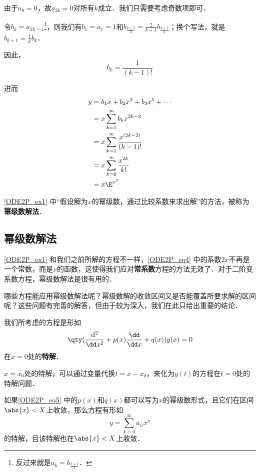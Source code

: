 \begin{example}{}
由于$a_0=0$，故$a_{2k}=0$对所有$k$成立．我们只需要考虑奇数项即可．

令$b_k=a_{2k-1}$\footnote{反过来就是$a_k=b_{\frac{k+1}{2}}$．}，则我们有$b_1=a_1=1$和$b_{\frac{k+3}{2}}=\frac{2}{k+1}b_{\frac{k+1}{2}}$；换个写法，就是$b_{k+1}=\frac{1}{k}b_k$．

因此，
\begin{equation}
b_k=\frac{1}{(k-1)!}
\end{equation}

进而
\begin{equation}\label{ODE2P_eq6}
\begin{aligned}
y&=b_1x+b_2x^3+b_3x^5+\cdots\\
 &=x\sum\limits_{k=1}^\infty b_kx^{2k-2}\\
 &=x\sum\limits_{k=1}^\infty \frac{x^{(2k-2)}}{(k-1)!}\\
 &=x\sum\limits_{k=0}^\infty \frac{x^{2k}}{k!}\\
 &=x\E^{x^2} 
\end{aligned}
\end{equation}

\end{example}

\autoref{ODE2P_ex1} 中“假设解为$x$的幂级数，通过比较系数来求出解”的方法，被称为\textbf{幂级数解法}．


\subsection{幂级数解法}

\autoref{ODE2P_ex1} 和我们之前所解的方程不一样，\autoref{ODE2P_eq4} 中的系数$2x$不再是一个常数，而是$x$的函数，这使得我们应对\textbf{常系数}方程的方法无效了．对于二阶变系数方程，幂级数解法是很有用的．

哪些方程能应用幂级数解法呢？幂级数解的收敛区间又是否能覆盖所要求解的区间呢？这些问题有完善的解答，但由于较为深入，我们在此只给出重要的结论．

我们所考虑的方程是形如
\begin{equation}\label{ODE2P_eq5}
\qty(\frac{\mathrm{d}^2}{\dd x^2}+p(x)\frac{\dd}{\dd x}+q(x))y(x)=0
\end{equation}
在$x=0$处的\textbf{特解}．

$x=x_0$处的特解，可以通过变量代换$t=x-x_0$，来化为$y(t)$的方程在$t=0$处的特解问题．

\begin{theorem}{}\label{ODE2P_the2}
如果\autoref{ODE2P_eq5} 中的$p(x)$和$q(x)$都可以写为$x$的幂级数形式，且它们在区间$\abs{x}<X$上收敛，那么方程有形如
\begin{equation}
y=\sum\limits_{k=0}^\infty a_nx^n
\end{equation}
的特解，且该特解也在$\abs{x}<X$上收敛．
\end{theorem}

